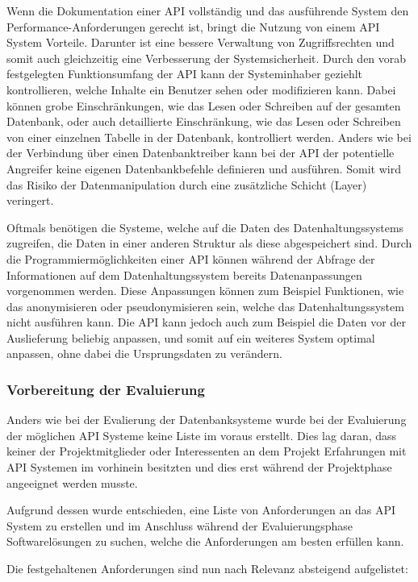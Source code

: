 Wenn die Dokumentation einer API vollständig und das ausführende System den
Performance-Anforderungen gerecht ist, bringt die Nutzung von einem API System
Vorteile. Darunter ist eine bessere Verwaltung von Zugriffsrechten und somit
auch gleichzeitig eine Verbesserung der Systemsicherheit. Durch den vorab
festgelegten Funktionsumfang der API kann der Systeminhaber geziehlt
kontrollieren, welche Inhalte ein Benutzer sehen oder modifizieren kann. Dabei
können grobe Einschränkungen, wie das Lesen oder Schreiben auf der gesamten
Datenbank, oder auch detaillierte Einschränkung, wie das Lesen oder Schreiben
von einer einzelnen Tabelle in der Datenbank, kontrolliert werden. Anders wie
bei der Verbindung über einen Datenbanktreiber kann bei der API der potentielle
Angreifer keine eigenen Datenbankbefehle definieren und ausführen. Somit wird
das Risiko der Datenmanipulation durch eine zusätzliche Schicht (Layer)
veringert.

Oftmals benötigen die Systeme, welche auf die Daten des Datenhaltungssystems
zugreifen, die Daten in einer anderen Struktur als diese abgespeichert sind.
Durch die Programmiermöglichkeiten einer API können während der Abfrage der
Informationen auf dem Datenhaltungssystem bereits Datenanpassungen vorgenommen
werden. Diese Anpassungen können zum Beispiel Funktionen, wie das anonymisieren
oder pseudonymisieren sein, welche das Datenhaltungssystem nicht ausführen
kann. Die API kann jedoch auch zum Beispiel die Daten vor der Auslieferung
beliebig anpassen, und somit auf ein weiteres System optimal anpassen, ohne
dabei die Ursprungsdaten zu verändern.
\nl%

\subsubsection{Vorbereitung der Evaluierung}
\label{subsubsec:api_vorbereitung_der_evaluierung}
Anders wie bei der Evalierung der Datenbanksysteme wurde bei der Evaluierung
der möglichen API Systeme keine Liste im voraus erstellt. Dies lag daran, dass
keiner der Projektmitglieder oder Interessenten an dem Projekt Erfahrungen mit
API Systemen im vorhinein besitzten und dies erst während der Projektphase
angeeignet werden musste.

Aufgrund dessen wurde entschieden, eine Liste von Anforderungen an das
API System zu erstellen und im Anschluss während der Evaluierungsphase
Softwarelösungen zu suchen, welche die Anforderungen am besten erfüllen kann.

Die festgehaltenen Anforderungen sind nun nach Relevanz absteigend aufgelistet:

